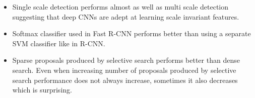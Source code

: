 \documentclass{article}
\begin{document}
\begin{itemize}
    \item Single scale detection performs almost as well as multi scale detection suggesting that deep CNNs are adept at learning scale invariant features.
    \item Softmax classifier used in Fast R-CNN performs better than using a separate SVM classifier like in R-CNN.
    \item Sparse proposals produced by selective search performs better than dense search. Even when increasing number of proposals produced by selective search performance does not always increase, sometimes it also decreases which is surprising.
    
\end{itemize}
\end{document}
